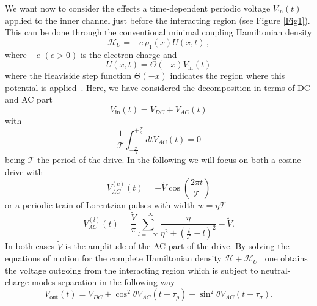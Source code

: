\documentclass[12pt]{iopart}
\begin{document}
We want now to consider the effects a time-dependent periodic voltage $V_{\mathrm{in}}(t)$ applied to the inner channel just before the interacting region (see Figure \ref{Fig1}). This can be done through the conventional minimal coupling Hamiltonian density
\begin{equation}
\mathcal{H}_{U}=-e\, \rho_{1}(x)U(x,t) \,,
\end{equation}
where $-e$ $(e>0)$ is the electron charge and
\begin{equation}
U(x,t)=\Theta(-x)V_{\mathrm{in}}(t)
\end{equation}
where the Heaviside step function $\Theta(-x)$ indicates the region where this potential is applied~\cite{Rech17, Vannucci17, Ronetti18, Ronetti19}. Here, we have considered the decomposition in terms of DC and AC part
\begin{equation}
V_{\mathrm{in}}(t)=V_{DC}+V_{AC}(t)
\end{equation}
with 
\begin{equation}
\frac{1}{\mathcal{T}}\int^{+\frac{\mathcal{T}}{2}}_{-\frac{\mathcal{T}}{2}} dt V_{AC}(t)=0
\label{AC_zero}
\end{equation}
being $\mathcal{T}$ the period of the drive. In the following we will focus on both a cosine drive with 
\begin{equation}
V^{(c)}_{AC}(t) = -\tilde{V} \cos \left( \frac{2 \pi t}{\mathcal{T}} \right)
\label{cosine}
\end{equation}
or a periodic train of Lorentzian pulses with width $w=\eta \mathcal{T}$
\begin{equation}
V^{(l)}_{AC}(t) = \frac{\tilde{V}}{\pi} \sum_{l=-\infty}^{+\infty} \frac{\eta}{\eta^2 + \left( \frac{t}{\mathcal{T}}-l \right)^2}-\tilde{V}.
\label{Lorentzian}
\end{equation}
In both cases $\tilde{V}$ is the amplitude of the AC part of the drive. By solving the equations of motion for the complete Hamiltonian density $\mathcal{H}+\mathcal{H}_{U}$~\cite{Safi99, Grenier13} one obtains the voltage outgoing from the interacting region which is subject to neutral-charge modes separation in the following way~\cite{Freulon15, Levkivskyi08, Safi99}
\begin{equation}
V_{\mathrm{out}}(t)= V_{DC}+\cos^{2}{\theta} V_{AC}(t-\tau_{\rho})+\sin^{2}{\theta}V_{AC}(t-\tau_{\sigma}).
\label{Vout}
\end{equation}
\end{document}
